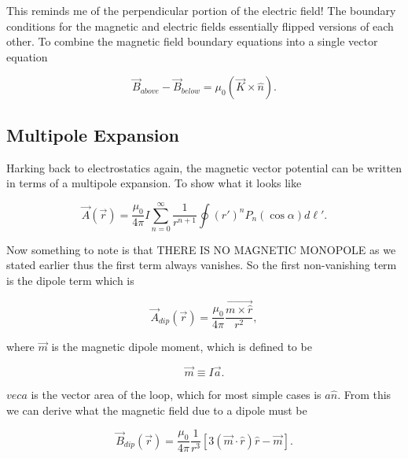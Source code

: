 \documentclass[preprint, review,12pt]{elsarticle}
\def\m{\frac{\mu_0}{4\pi}}
\def\x{\times}
\def\.{\cdot}
\begin{document}
This reminds me of the perpendicular portion of the electric field! The boundary conditions for the magnetic and electric fields essentially flipped versions of each other. To combine the magnetic field boundary equations into a single vector equation

\begin{equation}
    \vec{B}_{above} - \vec{B}_{below}= \mu_0 (\vec{K} \x \hat{n}).
\end{equation}

\subsection{Multipole Expansion}

Harking back to electrostatics again, the magnetic vector potential can be written in terms of a multipole expansion. To show what it looks like

\begin{equation}
    \vec{A}(\vec{r}) = \m I \sum_{n=0}^\infty \frac{1}{r^{n+1}}\oint (r')^n  P_n(\cos\alpha) d\ell '.
\end{equation}

Now something to note is that THERE IS NO MAGNETIC MONOPOLE as we stated earlier thus the first term always vanishes. So the first non-vanishing term is the dipole term which is

\begin{equation}
    \vec{A}_{dip}(\vec{r}) = \m \frac{\vec{m \x \hat{r}}}{r^2},
\end{equation}

where $\vec{m}$ is the magnetic dipole moment, which is defined to be

\begin{equation}
    \vec{m} \equiv I\vec{a}.
\end{equation}

$vec{a}$ is the vector area of the loop, which for most simple cases is $a\hat{n}$. From this we can derive what the magnetic field due to a dipole must be

\begin{equation}
    \vec{B}_{dip}(\vec{r}) = \m \frac{1}{r^3}[3(\vec{m} \. \hat{r})\hat{r} - \vec{m}].
\end{equation}
\end{document}
